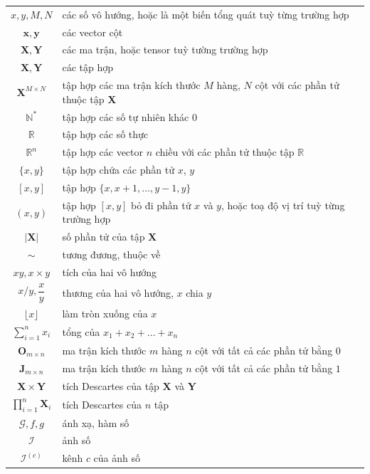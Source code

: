 \documentclass[a4paper, 12pt]{report}
\begin{document}
\begin{center}
\begin{tabular}{c|l}
    $x, y, M, N$ & các số vô hướng, hoặc là một biến tổng quát tuỳ từng trường hợp\\
    $\mathbf{x}, \mathbf{y}$ & các vector cột\\
    $\mathbf{X}, \mathbf{Y}$ & các ma trận, hoặc tensor tuỳ tường trường hợp\\
    $\bm{X}, \bm{Y}$ & các tập hợp\\
    $\bm{X}^{M \times N}$ & tập hợp các ma trận kích thước $M$ hàng, $N$ cột với các phần tử thuộc tập $\bm{X}$\\
    $\mathbb{N}^*$ & tập hợp các số tự nhiên khác $0$\\
    $\mathbb{R}$ & tập hợp các số thực\\
    $\mathbb{R}^n$ & tập hợp các vector $n$ chiều với các phần tử thuộc tập $\mathbb{R}$\\
    $\{x, y\}$ & tập hợp chứa các phần tử $x$, $y$\\
    $[x, y]$ & tập hợp $\{x, x + 1, \dots, y - 1, y\}$\\
    $(x, y)$ & tập hợp $[x, y]$ bỏ đi phần tử $x$ và $y$, hoặc toạ độ vị trí tuỳ từng trường hợp\\
    $\left|\bm{X}\right|$ & số phần tử của tập $\bm{X}$\\
    $\sim$ & tương đương, thuộc về\\
    $xy, x \times y$ & tích của hai vô hướng\\
    $x / y, \dfrac{x}{y}$ & thương của hai vô hướng, $x$ chia $y$\\
    $\lfloor x \rfloor$ & làm tròn xuống của $x$\\
    $\sum_{i=1}^nx_i$ & tổng của $x_1 + x_2 + \dots + x_n$\\
    $\mathbf{O}_{m \times n}$ & ma trận kích thước $m$ hàng $n$ cột với tất cả các phần tử bằng $0$\\
    $\mathbf{J}_{m \times n}$ & ma trận kích thước $m$ hàng $n$ cột với tất cả các phần tử bằng $1$\\
    $\bm{X} \times \bm{Y}$ & tích Descartes của tập $\bm{X}$ và $\bm{Y}$\\
    $\prod_{i=1}^n\bm{X}_i$ & tích Descartes của $n$ tập\\
    $\mathcal{G}, f, g$ & ánh xạ, hàm số\\
    $\mathcal{I}$ & ảnh số\\
    $\mathcal{I}^{\left(c\right)}$ & kênh $c$ của ảnh số\\

\end{tabular}
\end{center}
\end{document}

